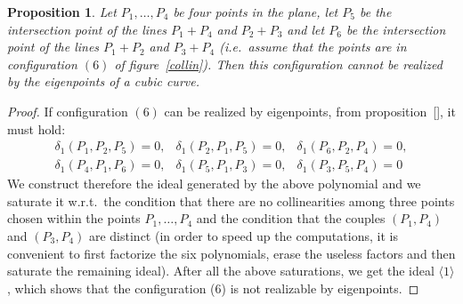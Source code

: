 \documentclass{amsart}
\theoremstyle{plain}
\newtheorem{prop}[theorem]{Proposition}
\theoremstyle{definition}
\begin{document}
\begin{prop}
  Let $P_1, \dots, P_4$ be four points in the plane,
  let $P_5$ be the intersection point of the lines $P_1+P_4$
  and $P_2+P_3$ and let $P_6$ be the intersection point of the lines
  $P_1+P_2$ and $P_3+P_4$ (i.e.\ assume that the points are in configuration
  $(6)$ of figure~\ref{collin}). Then this configuration cannot be realized by
  the eigenpoints of a cubic curve. 
\end{prop}
\begin{proof}
  If configuration $(6)$ can be realized by eigenpoints,
  from proposition~\ref{},
  it must hold:
  \[
  \begin{array}{lll}
\delta_1(P_1, P_2, P_5)=0,&\delta_1(P_2, P_1, P_5)=0,&\delta_1(P_6, P_2, P_4)=0,\\ 
\delta_1(P_4, P_1, P_6)=0,& \delta_1(P_5, P_1, P_3)=0,&\delta_1(P_3, P_5, P_4)=0
\end{array}
  \]
  We construct therefore the ideal generated by the above polynomial and we
  saturate it w.r.t.\ the condition that there are no collinearities among three
  points chosen within the points $P_1, \dots, P_4$ and the condition that
  the couples $(P_1, P_4)$ and $(P_3, P_4)$ are distinct (in order to speed up the
  computations, it is convenient to first factorize the six polynomials, erase the
  useless factors and then saturate the remaining ideal).
  After all the above saturations, we get the ideal $\langle 1\rangle$, which
  shows that the configuration (6) is not realizable by eigenpoints.
\end{proof}
\end{document}
